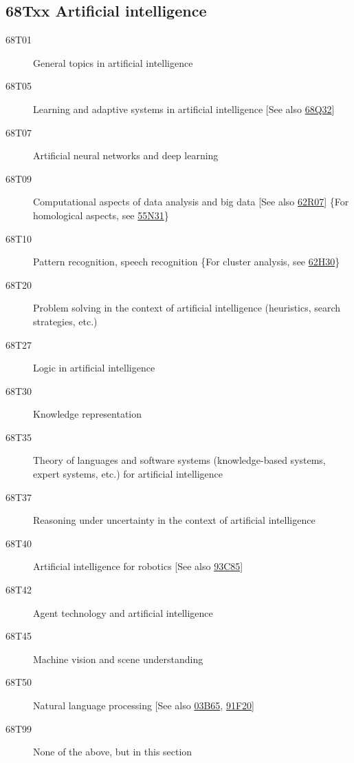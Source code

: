 \documentclass[letterpaper]{article}
\begin{document}
\subsection*{68Txx  Artificial intelligence }\label{68Txx}
\begin{description}
\item [68T01]\label{68T01} General topics in artificial intelligence
\item [68T05]\label{68T05} Learning and adaptive systems in artificial intelligence [See also \hyperref[68Q32]{68Q32}]
\item [68T07]\label{68T07} Artificial neural networks and deep learning
\item [68T09]\label{68T09} Computational aspects of data analysis and big data [See also \hyperref[62R07]{62R07}] \{For homological aspects, see \hyperref[55N31]{55N31}\}
\item [68T10]\label{68T10} Pattern recognition, speech recognition \{For cluster analysis, see \hyperref[62H30]{62H30}\}
\item [68T20]\label{68T20} Problem solving in the context of artificial intelligence (heuristics, search strategies, etc.)
\item [68T27]\label{68T27} Logic in artificial intelligence
\item [68T30]\label{68T30} Knowledge representation
\item [68T35]\label{68T35} Theory of languages and software systems (knowledge-based systems, expert systems, etc.) for artificial intelligence
\item [68T37]\label{68T37} Reasoning under uncertainty in the context of artificial intelligence
\item [68T40]\label{68T40} Artificial intelligence for robotics [See also \hyperref[93C85]{93C85}]
\item [68T42]\label{68T42} Agent technology and artificial intelligence
\item [68T45]\label{68T45} Machine vision and scene understanding
\item [68T50]\label{68T50} Natural language processing [See also \hyperref[03B65]{03B65}, \hyperref[91F20]{91F20}]
\item [68T99]\label{68T99} None of the above, but in this section
\end{description}
\end{document}
